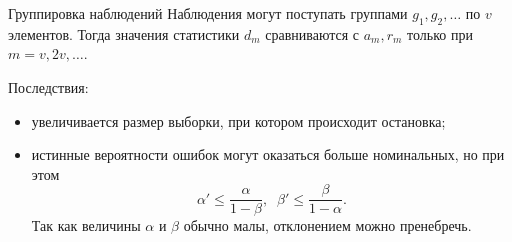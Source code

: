 \documentclass[9pt,pdf,utf8,hyperref={unicode},aspectratio=169]{beamer}
\renewcommand{\leq}{\leqslant}
\begin{document}
\begin{frame}{Группировка наблюдений}
    Наблюдения могут поступать группами $g_1, g_2, \dots$ по $v$ элементов.
    Тогда значения статистики $d_m$ сравниваются с $a_m, r_m$ только при $m = v, 2v, \dots$.

    \bigskip

    Последствия:
    \begin{itemize}
    \item увеличивается размер выборки, при котором происходит остановка;
    \item истинные вероятности ошибок могут оказаться больше номинальных, но при этом
        $$\alpha'\leq\frac{\alpha}{1-\beta}, \;\; \beta'\leq\frac{\beta}{1-\alpha}.$$
        Так как величины $\alpha$ и $\beta$ обычно малы, отклонением можно пренебречь.
    \end{itemize}
\end{frame}
\end{document}
